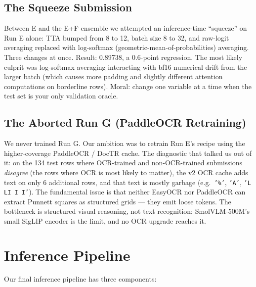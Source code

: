 \documentclass[11pt]{article}
\begin{document}
\subsection{The Squeeze Submission}
Between E and the E+F ensemble we attempted an inference-time ``squeeze'' on Run E alone: TTA bumped from 8 to 12, batch size 8 to 32, and raw-logit averaging replaced with log-softmax (geometric-mean-of-probabilities) averaging. Three changes at once. Result: 0.89738, a 0.6-point regression. The most likely culprit was log-softmax averaging interacting with bf16 numerical drift from the larger batch (which causes more padding and slightly different attention computations on borderline rows). Moral: change one variable at a time when the test set is your only validation oracle.

\subsection{The Aborted Run G (PaddleOCR Retraining)}
We never trained Run G. Our ambition was to retrain Run E's recipe using the higher-coverage PaddleOCR / DocTR cache. The diagnostic that talked us out of it: on the 134 test rows where OCR-trained and non-OCR-trained submissions \emph{disagree} (the rows where OCR is most likely to matter), the v2 OCR cache adds text on only 6 additional rows, and that text is mostly garbage (e.g.\ \texttt{'\%'}, \texttt{'A'}, \texttt{'L LI I I'}). The fundamental issue is that neither EasyOCR nor PaddleOCR can extract Punnett squares as structured grids --- they emit loose tokens. The bottleneck is structured visual reasoning, not text recognition; SmolVLM-500M's small SigLIP encoder is the limit, and no OCR upgrade reaches it.

\section{Inference Pipeline}

Our final inference pipeline has three components:
\end{document}
